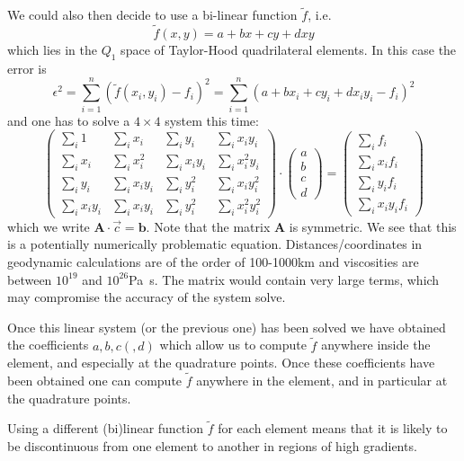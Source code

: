 We could also then decide to use a bi-linear function $\tilde{f}$, i.e.
\[
\tilde{f}(x,y)=a+bx+cy+dxy
\]
which lies in the $Q_1$ space of Taylor-Hood quadrilateral elements. In this case the error is 
\[
\epsilon^2 
= \sum_{i=1}^n ( \tilde{f}(x_i,y_i)-f_i)^2
= \sum_{i=1}^n (a+bx_i+cy_i + dx_iy_i -f_i)^2
\]
and one has to solve a $4\times 4$ system this time:
\[
\left( 
\begin{array}{cccc}
\sum\limits_i 1 & \sum\limits_i x_i & \sum\limits_i y_i & \sum\limits_i x_iy_i\\
\sum\limits_i x_i & \sum\limits_i x_i^2 & \sum\limits_i x_iy_i & \sum\limits_i x_i^2 y_i\\
\sum\limits_i y_i & \sum\limits_i x_i y_i & \sum\limits_i y_i^2 & \sum\limits_i x_iy_i^2\\ 
\sum\limits_i x_iy_i & \sum\limits_i x_i y_i & \sum\limits_i y_i^2 & \sum\limits_i x_i^2y_i^2  
\end{array}
\right)
\cdot
\left(
\begin{array}{c}
a\\
b\\
c\\
d
\end{array}
\right)
=
\left(
\begin{array}{c}
\sum\limits_i f_i \\
\sum\limits_i x_i f_i \\
\sum\limits_i y_i f_i \\
\sum\limits_i x_i y_i f_i 
\end{array}
\right)
\]
which we write ${\bm A}\cdot \vec{c}={\bm b}$. Note that 
the matrix ${\bm A}$ is symmetric.
We see that this is a potentially numerically problematic equation. 
Distances/coordinates in geodynamic calculations are of the order of 100-1000\si{\km} and 
viscosities are between $10^{19}$ and $10^{26}$\si{\pascal\second}. 
The matrix would contain very large terms, which may compromise the accuracy of the system solve.

Once this linear system (or the previous one) has been solved we have obtained the coefficients $a,b,c(,d)$ 
which allow us to compute $\tilde{f}$ anywhere inside the element, and especially 
at the quadrature points. Once these coefficients have been obtained one can compute $\tilde{f}$
anywhere in the element, and in particular at the quadrature points.  

\begin{remark}
Using a different (bi)linear function $\tilde{f}$ for each element 
means that it is likely to be discontinuous 
from one element to another in regions of high gradients. 
\end{remark}

